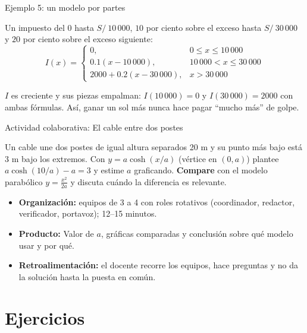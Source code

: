 \documentclass[10pt,aspectratio=169]{beamer}
\begin{document}
\begin{frame}{Ejemplo 5: un modelo por partes}
  \begin{ejemplo}
    Un impuesto del $0$ hasta $S/\ 10\,000$, $10$ por ciento sobre el exceso hasta $S/\ 30\,000$ y $20$ por ciento sobre el exceso siguiente:
    \[ I(x)=\begin{cases}0,&0\le x\le10\,000\\0.1(x-10\,000),&10\,000<x\le30\,000\\2000+0.2(x-30\,000),&x>30\,000\end{cases} \]
  \end{ejemplo}
  \begin{observacion}
    $I$ es creciente y sus piezas empalman: $I(10\,000)=0$ y $I(30\,000)=2000$ con ambas fórmulas. Así, ganar un sol más nunca
    hace pagar ``mucho más'' de golpe.
  \end{observacion}
\end{frame}

\begin{frame}{Actividad colaborativa: El cable entre dos postes}
  \small
  \begin{activa}
    Un cable une dos postes de igual altura separados 20 m y su punto más bajo está 3 m bajo los extremos. Con $y=a\cosh(x/a)$ (vértice en $(0,a)$) plantee $a\cosh(10/a)-a=3$ y estime $a$ graficando. \textbf{Compare} con el modelo parabólico $y=\frac{x^2}{2a}$ y discuta cuándo la diferencia es relevante.
  \end{activa}
  \begin{itemize}
    \item \textbf{Organización:} equipos de 3 a 4 con roles rotativos (coordinador, redactor, verificador, portavoz); 12--15 minutos.
    \item \textbf{Producto:} Valor de $a$, gráficas comparadas y conclusión sobre qué modelo usar y por qué.
    \item \textbf{Retroalimentación:} el docente recorre los equipos, hace preguntas y no da la solución hasta la puesta en común.
  \end{itemize}
\end{frame}

\section{Ejercicios}
\end{document}

